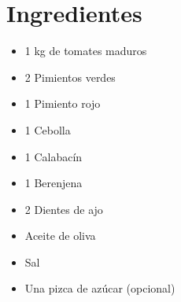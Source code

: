 
    \begin{minipage}[t]{0.35\textwidth}
        \section*{Ingredientes}
        \begin{itemize}[leftmargin=*]
            \item 1 kg de tomates maduros
            \item 2 Pimientos verdes
            \item 1 Pimiento rojo
            \item 1 Cebolla
            \item 1 Calabacín
            \item 1 Berenjena
            \item 2 Dientes de ajo
            \item Aceite de oliva
            \item Sal
            \item Una pizca de azúcar (opcional)
        \end{itemize}
    \end{minipage}
    \hfill
